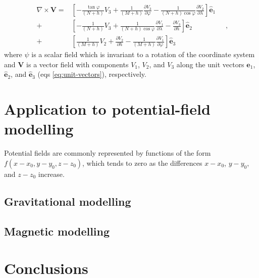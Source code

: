 \documentclass[mreferee]{gji}
\begin{document}
\begin{equation} \label{eq:curl-geodetic}
\begin{split}
\nabla \times \mathbf{V} = 
& \left[ - \frac{\tan \varphi}{\left( N + h \right)} V_{3} + \frac{1}{\left( M + h \right)} \frac{\partial V_{3}}{\partial \varphi}
- \frac{1}{\left( N + h \right) \cos \varphi} \frac{\partial V_{2}}{\partial \lambda} \right] \hat{\mathbf{e}}_{1} \\
+ & \left[ - \frac{1}{\left( N + h \right)} V_{3} + \frac{1}{\left( N + h \right) \cos \varphi} \frac{\partial V_{1}}{\partial \lambda}
- \frac{\partial V_{3}}{\partial h} \right] \hat{\mathbf{e}}_{2} \\
+ & \left[ \frac{1}{\left( M + h \right)} V_{2} + \frac{\partial V_{2}}{\partial h}
- \frac{1}{\left( M + h \right) } \frac{\partial V_{1}}{\partial \varphi} \right] \hat{\mathbf{e}}_{3}
\end{split} \quad ,
\end{equation}
where $\psi$ is a scalar field which is invariant to
a rotation of the coordinate system and $\mathbf{V}$
is a vector field with components $V_{1}$, $V_{2}$, and $V_{3}$ along the
unit vectors $\hat{\mathbf{e}}_{1}$, $\hat{\mathbf{e}}_{2}$, and
$\hat{\mathbf{e}}_{3}$ (eqs \ref{eq:unit-vectors}), respectively.


\section{Application to potential-field modelling}


Potential fields are commonly represented
by functions of the form $f(x - x_{0}, y - y_{0}, z - z_{0})$,
which tends to zero as the differences $x - x_{0}$, $y - y_{0}$,
and $z - z_{0}$ increase.




\subsection{Gravitational modelling}



\subsection{Magnetic modelling}



\section{Conclusions}
\end{document}
